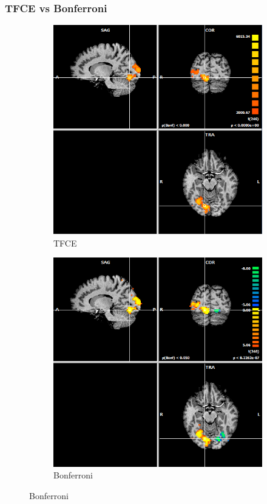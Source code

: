 \documentclass{beamer}
\begin{document}
\begin{frame}
\frametitle{TFCE vs Bonferroni}
\begin{figure}
    \centering
    \begin{subfigure}[b]{0.48\textwidth}
        \includegraphics[width=\textwidth]{Images/Brainvoyager-TFCE83187129.png}
	\caption{TFCE}
    \end{subfigure}
    \begin{subfigure}[b]{0.48\textwidth}
        \includegraphics[width=\textwidth]{Images/Brainvoyager-Bonferroni83187129.png}
	\caption{Bonferroni}
    \end{subfigure}
\end{figure}
\end{frame}
\end{document}
